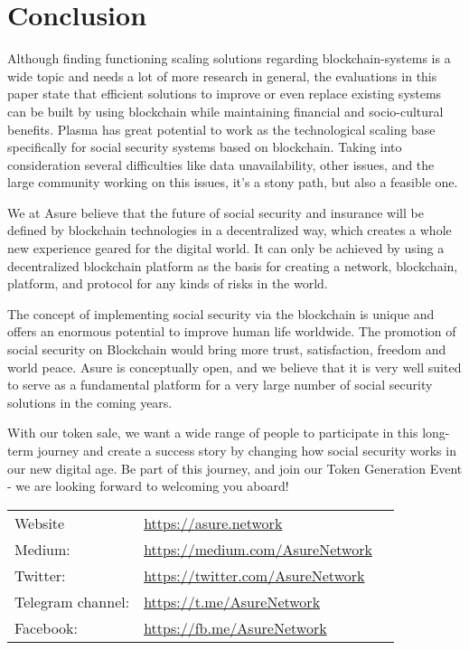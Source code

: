 \section*{Conclusion}

Although finding functioning scaling solutions regarding blockchain-systems is a wide topic and needs a lot of more research in general, the evaluations in this paper state that efficient solutions to improve or even replace existing systems can be built by using blockchain while maintaining financial and socio-cultural benefits.
Plasma has great potential to work as the technological scaling base specifically for social security systems based on blockchain. Taking into consideration several difficulties like data unavailability, other issues, and the large community working on this issues, it’s a stony path, but also a feasible one.
\newline

We at Asure believe that the future of social security and insurance will be defined by blockchain technologies in a decentralized way, which creates a whole new experience geared for the digital world. It can only be achieved by using a decentralized blockchain platform as the basis for creating a network, blockchain, platform, and protocol for any kinds of risks in the world. 
\newline

The concept of implementing social security via the blockchain is unique and offers an enormous potential to improve human life worldwide. The promotion of social security on Blockchain would bring more trust, satisfaction, freedom and world peace. Asure is conceptually open, and we believe that it is very well suited to serve as a fundamental platform for a very large number of social security solutions in the coming years.
\newline

With our token sale, we want a wide range of people to participate in this long-term journey and create a success story by changing how social security works in our new digital age. Be part of this journey, and join our Token Generation Event - we are looking forward to welcoming you aboard!
\newline\newline

\begin{table}[H]
\begin{tabular}{lp{}l}
  Website & \url{https://asure.network}\\
  Medium: & \url{https://medium.com/AsureNetwork}\\
  Twitter: & \url{https://twitter.com/AsureNetwork}\\
  Telegram channel: & \url{https://t.me/AsureNetwork}\\
  Facebook: & \url{https://fb.me/AsureNetwork}\\
\end{tabular}
\end{table} 